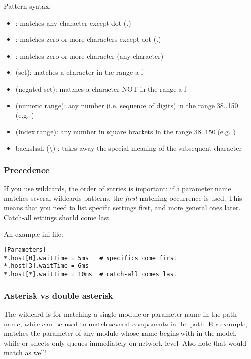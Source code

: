 Pattern syntax:

\begin{itemize}
  \item {} : matches any character except dot (.)
  \item \ttt{*} : matches zero or more characters except dot (.)
  \item \ttt{**} : matches zero or more character (any character)
  \item {} (set): matches a character in the range a-f
  \item {} (negated set): matches a character NOT in the range a-f
  \item {} (numeric range): any number (i.e. sequence of digits)
    in the range 38..150  (e.g. )
  \item \ttt{[38..150]} (index range): any number in square brackets in the
    range 38..150 (e.g. \ttt{[99]})
  \item backslash ({\textbackslash}) : takes away the special meaning of the
    subsequent character
\end{itemize}

\subsubsection{Precedence}

If you use wildcards, the order of entries is important: if a parameter
name matches several wildcards-patterns, the \textit{first} matching occurrence
is used. This means that you need to list specific settings first, and
more general ones later. Catch-all settings should come last.

An example ini file:

\begin{verbatim}
[Parameters]
*.host[0].waitTime = 5ms   # specifics come first
*.host[3].waitTime = 6ms
*.host[*].waitTime = 10ms  # catch-all comes last
\end{verbatim}


\subsubsection{Asterisk vs double asterisk}

The \ttt{*} wildcard is for matching a single module or parameter name in the
path name, while \ttt{**} can be used to match several components in the path.
For example,  matches the  parameter of any module
whose name begins with  in the model, while 
or  selects only queues immediately on network level.
Also note that  would match 
as well!

